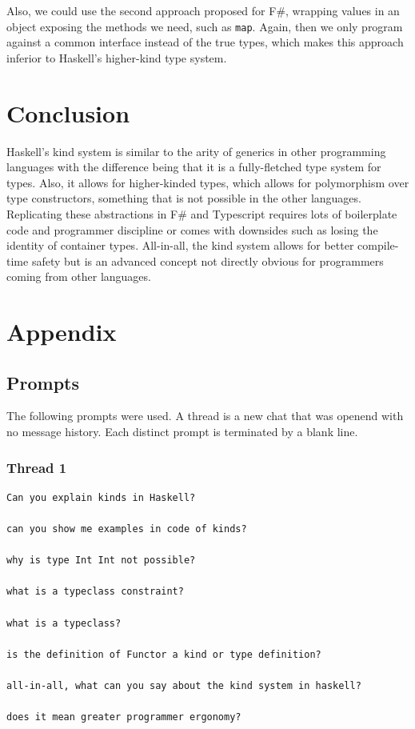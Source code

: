\documentclass[12pt,oneside,a4paper]{article}
\begin{document}
Also, we could use the second approach proposed for F\#, wrapping values in an object exposing the methods we need, such as \texttt{map}. Again, then we only program against a common interface instead of the true types, which makes this approach inferior to Haskell's higher-kind type system.


\section{Conclusion}
Haskell's kind system is similar to the arity of generics in other programming languages with the difference being that it is a fully-fletched type system for types. Also, it allows for higher-kinded types, which allows for polymorphism over type constructors, something that is not possible in the other languages. Replicating these abstractions in F\# and Typescript requires lots of boilerplate code and programmer discipline or comes with downsides such as losing the identity of container types. All-in-all, the kind system allows for better compile-time safety but is an advanced concept not directly obvious for programmers coming from other languages.


\appendix
\section{Appendix}
\subsection{Prompts}
The following prompts were used. A thread is a new chat that was openend with no message history. Each distinct prompt is terminated by a blank line.
\subsubsection*{Thread 1}
\begin{lstlisting}
Can you explain kinds in Haskell?

can you show me examples in code of kinds?

why is type Int Int not possible?

what is a typeclass constraint?

what is a typeclass?

is the definition of Functor a kind or type definition?

all-in-all, what can you say about the kind system in haskell?

does it mean greater programmer ergonomy?
\end{lstlisting}
\end{document}

